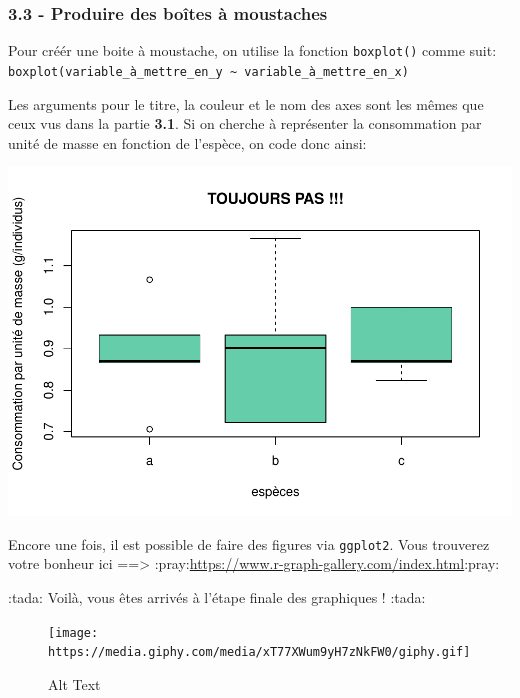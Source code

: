 \documentclass[
]{article}
\newenvironment{Shaded}{\begin{snugshade}}{\end{snugshade}}
\newcommand{\DataTypeTok}[1]{\textcolor[rgb]{0.13,0.29,0.53}{#1}}
\newcommand{\KeywordTok}[1]{\textcolor[rgb]{0.13,0.29,0.53}{\textbf{#1}}}
\newcommand{\NormalTok}[1]{#1}
\newcommand{\OperatorTok}[1]{\textcolor[rgb]{0.81,0.36,0.00}{\textbf{#1}}}
\newcommand{\StringTok}[1]{\textcolor[rgb]{0.31,0.60,0.02}{#1}}
\begin{document}
\hypertarget{produire-des-bouxeetes-uxe0-moustaches}{%
\subsubsection{3.3 - Produire des boîtes à
moustaches}\label{produire-des-bouxeetes-uxe0-moustaches}}

Pour créér une boite à moustache, on utilise la fonction
\texttt{boxplot()} comme suit:
\texttt{boxplot(variable\_à\_mettre\_en\_y\ \textasciitilde{}\ variable\_à\_mettre\_en\_x)}

Les arguments pour le titre, la couleur et le nom des axes sont les
mêmes que ceux vus dans la partie \textbf{3.1}. Si on cherche à
représenter la consommation par unité de masse en fonction de l'espèce,
on code donc ainsi:

\begin{Shaded}
\end{Shaded}

\includegraphics{Utilisation_R_base_files/figure-latex/unnamed-chunk-14-1.pdf}

Encore une fois, il est possible de faire des figures via
\texttt{ggplot2}. Vous trouverez votre bonheur ici ==\textgreater{}
:pray:\url{https://www.r-graph-gallery.com/index.html}:pray:

:tada: Voilà, vous êtes arrivés à l'étape finale des graphiques ! :tada:

\begin{figure}
\centering
\texttt{[image: https://media.giphy.com/media/xT77XWum9yH7zNkFW0/giphy.gif]}
\caption{Alt Text}
\end{figure}
\end{document}
